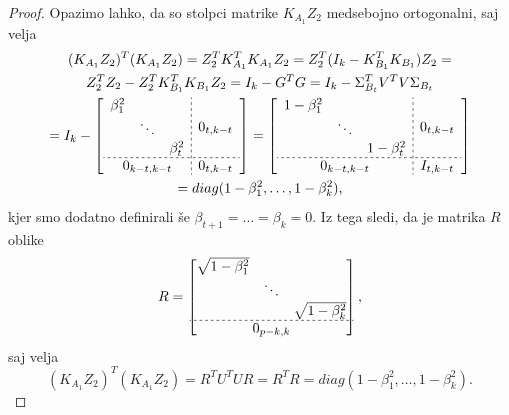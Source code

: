 \documentclass[mat1]{article}
\begin{document}
\begin{proof}

Opazimo lahko, da so stolpci matrike $K_{A_1} Z_2$ medsebojno ortogonalni, saj velja
\begin{gather*}
(K_{A_1} Z_2)^T (K_{A_1} Z_2) = Z_2^T K_{A_1}^T K_{A_1} Z_2 %
= Z_2^T (I_{k} - K_{B_1}^T K_{B_1}) Z_2 =
\\
Z_2^T Z_2 -  Z_2^T K_{B_1}^T K_{B_1} Z_2
= I_k - G^T G = I_k - \Sigma_{B_t}^T V^T V \Sigma_{B_t} 
\\
= I_k - 
\left[
\begin{array}{c;{2pt/2pt}c}
\begin{matrix}
\beta_1^2 & & \\
 & \ddots & \\
 & & \beta_t^2
\end{matrix} & 0_{t,k - t}
 \\ \hdashline[2pt/2pt]
0_{k - t, k - t} & 0_{t, k - t}
\end{array} \right] 
= 
\left[
\begin{array}{c;{2pt/2pt}c}
\begin{matrix}
1 - \beta_1^2 & & \\
 & \ddots & \\
 & & 1 - \beta_t^2
\end{matrix} & 0_{t,k - t}
 \\ \hdashline[2pt/2pt]
0_{k - t, k - t} & I_{t, k - t}
\end{array} \right]  
\\ 
= diag(1-\beta_1^2, \ldots, 1-\beta_k^2) \text{,}
\end{gather*}
kjer smo dodatno definirali še $\beta_{t+1} = \ldots = \beta_{k} = 0$. 
Iz tega sledi, da je matrika $R$ oblike 
$$ R = 
\begin{bmatrix}
\begin{matrix}
\sqrt{1 - \beta_1^2} & & \\
 & \ddots & \\
 & & \sqrt{1 - \beta_k^2}
\end{matrix} \\ \hdashline[2pt/2pt]
0_{p-k, k}
\end{bmatrix} \text{,}
$$ saj velja 
$$
(K_{A_1} Z_2)^T (K_{A_1} Z_2) = R^T U^T U R = R^T R = diag(1-\beta_1^2, \ldots, 1-\beta_k^2) \text{.}
$$
\end{proof}
\end{document}
